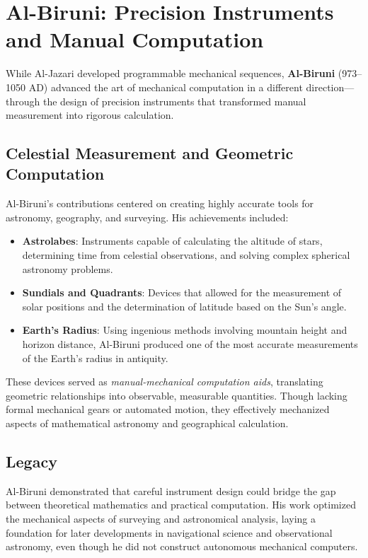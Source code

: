 \section{Al-Biruni: Precision Instruments and Manual Computation}

While Al-Jazari developed programmable mechanical sequences, \textbf{Al-Biruni} (973--1050 AD) advanced the art of mechanical computation in a different direction---through the design of precision instruments that transformed manual measurement into rigorous calculation.

\subsection{Celestial Measurement and Geometric Computation}

Al-Biruni's contributions centered on creating highly accurate tools for astronomy, geography, and surveying. His achievements included:

\begin{itemize}
    \item \textbf{Astrolabes}: Instruments capable of calculating the altitude of stars, determining time from celestial observations, and solving complex spherical astronomy problems.
    \item \textbf{Sundials and Quadrants}: Devices that allowed for the measurement of solar positions and the determination of latitude based on the Sun’s angle.
    \item \textbf{Earth's Radius}: Using ingenious methods involving mountain height and horizon distance, Al-Biruni produced one of the most accurate measurements of the Earth's radius in antiquity.
\end{itemize}

These devices served as \textit{manual-mechanical computation aids}, translating geometric relationships into observable, measurable quantities. Though lacking formal mechanical gears or automated motion, they effectively mechanized aspects of mathematical astronomy and geographical calculation.

\subsection{Legacy}

Al-Biruni demonstrated that careful instrument design could bridge the gap between theoretical mathematics and practical computation. His work optimized the mechanical aspects of surveying and astronomical analysis, laying a foundation for later developments in navigational science and observational astronomy, even though he did not construct autonomous mechanical computers.

